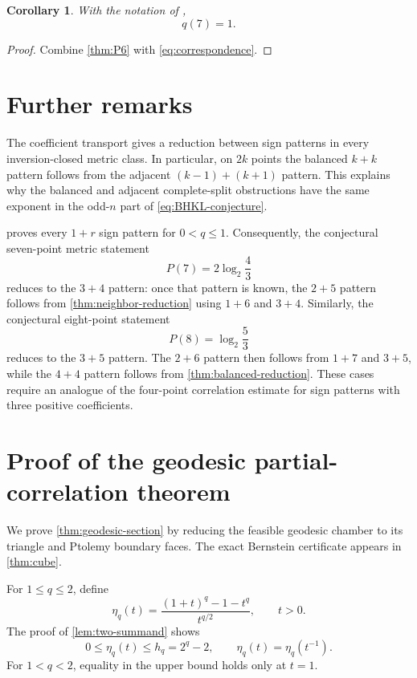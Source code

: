 \documentclass[11pt]{amsart}
\newtheorem{corollary}[corollary]{Corollary}
\theoremstyle{definition}
\theoremstyle{remark}
\begin{document}
\begin{corollary}\label{cor:q7}
With the notation of \cite{BHKL},
\[
 \boxed{q(7)=1.}
\]
\end{corollary}

\begin{proof}
Combine \cref{thm:P6} with \eqref{eq:correspondence}.
\end{proof}

\section{Further remarks}

The coefficient transport gives a reduction between sign patterns in every
inversion-closed metric class. In particular, on $2k$ points the balanced
$k+k$ pattern follows from the adjacent $(k-1)+(k+1)$ pattern. This explains why the balanced and adjacent complete-split
obstructions have the same exponent in the odd-$n$ part of \eqref{eq:BHKL-conjecture}.

 proves every $1+r$ sign pattern for
$0<q\le1$. Consequently, the conjectural seven-point metric statement
\[
 P(7)=2\log_2\frac43
\]
reduces to the $3+4$ pattern: once that pattern is known, the $2+5$
pattern follows from \cref{thm:neighbor-reduction} using $1+6$ and
$3+4$. Similarly, the conjectural eight-point statement
\[
 P(8)=\log_2\frac53
\]
reduces to the $3+5$ pattern. The $2+6$ pattern then follows from $1+7$
and $3+5$, while the $4+4$ pattern follows from
\cref{thm:balanced-reduction}. These cases require an analogue of the four-point correlation estimate
for sign patterns with three positive coefficients.

\appendix
\section{Proof of the geodesic partial-correlation theorem}\label{app:geodesic}

We prove \cref{thm:geodesic-section} by reducing the feasible
geodesic chamber to its triangle and Ptolemy boundary faces. The exact
Bernstein certificate appears in \cref{thm:cube}.

For $1\le q\le2$, define
\[
 \eta_q(t)=\frac{(1+t)^q-1-t^q}{t^{q/2}},\qquad t>0.
\]
The proof of \cref{lem:two-summand} shows
\begin{equation}\label{eq:eta-global}
 0\le\eta_q(t)\le h_q=2^q-2,
 \qquad
 \eta_q(t)=\eta_q(t^{-1}).
\end{equation}
For $1<q<2$, equality in the upper bound holds only at $t=1$.
\end{document}
